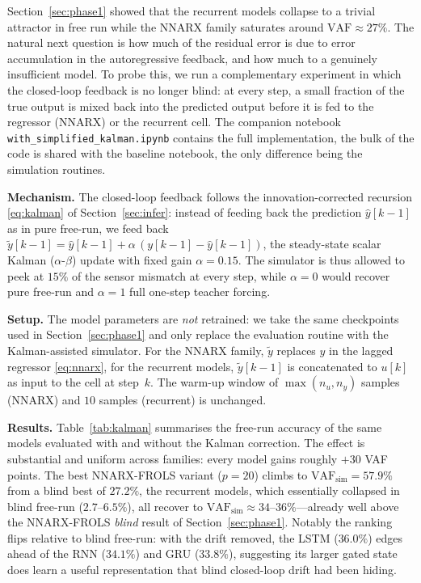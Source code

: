 \documentclass[10pt,twocolumn,letterpaper]{article}
\begin{document}
Section~\ref{sec:phase1} showed that the recurrent models collapse to a
trivial attractor in free run while the NNARX family saturates around
$\mathrm{VAF}\approx 27\%$. The natural next question is how much of the
residual error is due to error accumulation in the autoregressive
feedback, and how much to a genuinely insufficient model. To probe this,
we run a complementary experiment in which the closed-loop feedback is no
longer blind: at every step, a small fraction of the true output is mixed
back into the predicted output before it is fed to the regressor (NNARX)
or the recurrent cell. The companion notebook
\texttt{with\_simplified\_kalman.ipynb} contains the full implementation,
the bulk of the code is shared with the baseline notebook, the only
difference being the simulation routines.

\noindent\textbf{Mechanism.}
The closed-loop feedback follows the innovation-corrected recursion
\eqref{eq:kalman} of Section~\ref{sec:infer}: instead of feeding back the
prediction $\hat{y}[k-1]$ as in pure free-run, we feed back
$\tilde{y}[k-1]=\hat{y}[k-1]+\alpha\,(y[k-1]-\hat{y}[k-1])$, the
steady-state scalar Kalman ($\alpha$-$\beta$) update with fixed gain
$\alpha=0.15$. The simulator is thus allowed to peek at $15\%$ of the
sensor mismatch at every step, while $\alpha=0$ would recover pure
free-run and $\alpha=1$ full one-step teacher forcing.

\noindent\textbf{Setup.}
The model parameters are \emph{not} retrained: we take the same
checkpoints used in Section~\ref{sec:phase1} and only replace the
evaluation routine with the Kalman-assisted simulator. For the NNARX
family, $\tilde{y}$ replaces $y$ in the lagged regressor
\eqref{eq:nnarx}, for the recurrent models, $\tilde{y}[k-1]$ is
concatenated to $u[k]$ as input to the cell at step~$k$. The warm-up
window of $\max(n_u,n_y)$ samples (NNARX) and $10$ samples (recurrent) is
unchanged.

\noindent\textbf{Results.}
Table~\ref{tab:kalman} summarises the free-run accuracy of the same
models evaluated with and without the Kalman correction. The effect is
substantial and uniform across families: every model gains roughly
$+30$ VAF points. The best NNARX-FROLS variant ($p=20$) climbs to
$\mathrm{VAF_{sim}}=57.9\%$ from a blind best of $27.2\%$, the recurrent
models, which essentially collapsed in blind free-run ($2.7$--$6.5\%$),
all recover to $\mathrm{VAF_{sim}}\approx 34$--$36\%$---already well above
the NNARX-FROLS \emph{blind} result of Section~\ref{sec:phase1}. Notably
the ranking flips relative to blind free-run: with the drift removed, the
LSTM ($36.0\%$) edges ahead of the RNN ($34.1\%$) and GRU ($33.8\%$),
suggesting its larger gated state does learn a useful representation that
blind closed-loop drift had been hiding.
\end{document}
